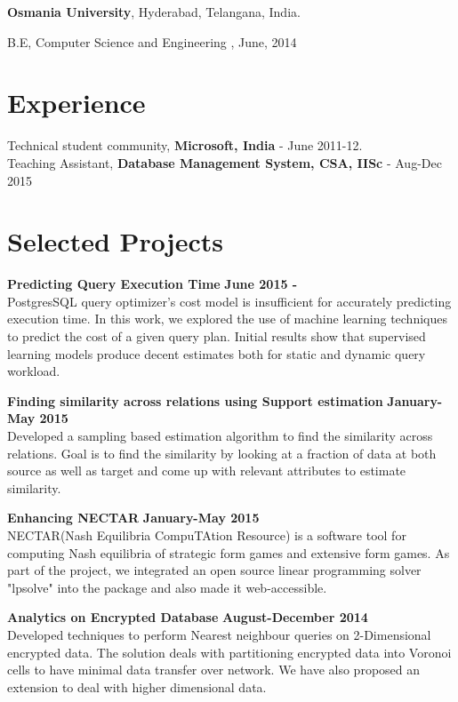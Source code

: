 \documentclass[margin,line]{res}
\newenvironment{list1}{
  \begin{list}{\ding{113}}{%
      \setlength{\itemsep}{0in}
      \setlength{\parsep}{0in} \setlength{\parskip}{0in}
      \setlength{\topsep}{0in} \setlength{\partopsep}{0in} 
      \setlength{\leftmargin}{0.17in}}}{\end{list}}
\begin{document}
\begin{resume}
{\bf Osmania University}, Hyderabad, Telangana, India.\\
\vspace*{-.1in}
\begin{list1}
\item[] B.E, Computer Science and Engineering ,  June, 2014
\end{list1}
\section{\sc Experience}

Technical student community, {\bf Microsoft, India} - June 2011-12.\\
Teaching Assistant,  {\bf Database Management System, CSA, IISc} - Aug-Dec 2015
\section{\sc Selected Projects}
{\bf Predicting Query Execution Time}
\hfill {\bf June 2015  - }\\
PostgresSQL query optimizer's cost model is insufficient for accurately predicting execution time. In this work, we explored the use of machine learning techniques to predict the cost of a given query plan. Initial results show that supervised learning models produce decent estimates both for static and dynamic query workload.

{\bf Finding similarity across relations using Support estimation}
\hfill {\bf January-May 2015}\\
Developed a sampling based estimation algorithm to find the similarity across relations. Goal is to find the similarity by looking at a fraction of data at both source as well as target and come up with relevant attributes to estimate similarity. 

{\bf Enhancing NECTAR}
\hfill {\bf  January-May 2015}\\
NECTAR(Nash Equilibria CompuTAtion Resource) is a software tool for computing Nash equilibria of strategic form games and extensive form games. As part of the project, we integrated an open source linear programming solver "lpsolve" into the package and also made it web-accessible.

{\bf Analytics on Encrypted Database}
\hfill {\bf  August-December 2014}\\
Developed techniques to perform Nearest neighbour queries on 2-Dimensional encrypted data. The solution deals with partitioning encrypted  data into Voronoi cells to have minimal data transfer over network. We have also proposed an extension to deal with higher dimensional data.


\end{resume}
\end{document}
